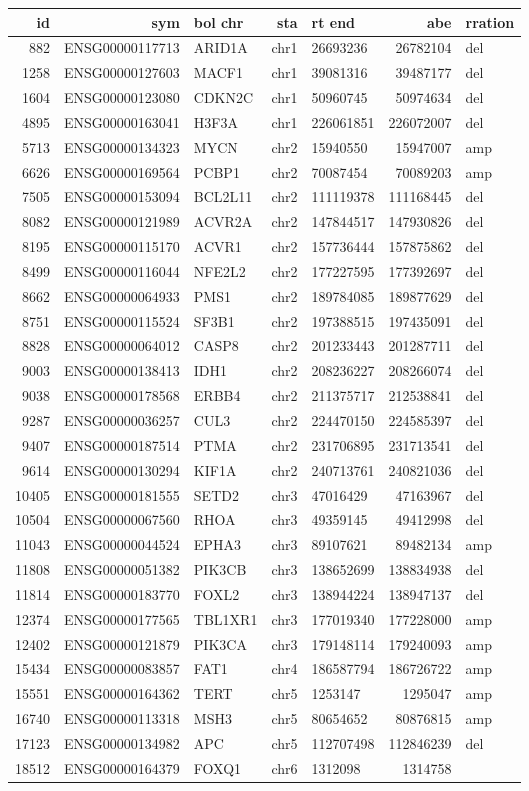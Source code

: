 \documentclass[]{article}
\begin{document}
\begin{longtable}[]{@{}rrlrlrl@{}}
\toprule
id & sym & bol chr & sta & rt end & abe & rration\tabularnewline
\midrule
\endhead
882 & ENSG00000117713 & ARID1A & chr1 & 26693236 & 26782104 &
del\tabularnewline
1258 & ENSG00000127603 & MACF1 & chr1 & 39081316 & 39487177 &
del\tabularnewline
1604 & ENSG00000123080 & CDKN2C & chr1 & 50960745 & 50974634 &
del\tabularnewline
4895 & ENSG00000163041 & H3F3A & chr1 & 226061851 & 226072007 &
del\tabularnewline
5713 & ENSG00000134323 & MYCN & chr2 & 15940550 & 15947007 &
amp\tabularnewline
6626 & ENSG00000169564 & PCBP1 & chr2 & 70087454 & 70089203 &
amp\tabularnewline
7505 & ENSG00000153094 & BCL2L11 & chr2 & 111119378 & 111168445 &
del\tabularnewline
8082 & ENSG00000121989 & ACVR2A & chr2 & 147844517 & 147930826 &
del\tabularnewline
8195 & ENSG00000115170 & ACVR1 & chr2 & 157736444 & 157875862 &
del\tabularnewline
8499 & ENSG00000116044 & NFE2L2 & chr2 & 177227595 & 177392697 &
del\tabularnewline
8662 & ENSG00000064933 & PMS1 & chr2 & 189784085 & 189877629 &
del\tabularnewline
8751 & ENSG00000115524 & SF3B1 & chr2 & 197388515 & 197435091 &
del\tabularnewline
8828 & ENSG00000064012 & CASP8 & chr2 & 201233443 & 201287711 &
del\tabularnewline
9003 & ENSG00000138413 & IDH1 & chr2 & 208236227 & 208266074 &
del\tabularnewline
9038 & ENSG00000178568 & ERBB4 & chr2 & 211375717 & 212538841 &
del\tabularnewline
9287 & ENSG00000036257 & CUL3 & chr2 & 224470150 & 224585397 &
del\tabularnewline
9407 & ENSG00000187514 & PTMA & chr2 & 231706895 & 231713541 &
del\tabularnewline
9614 & ENSG00000130294 & KIF1A & chr2 & 240713761 & 240821036 &
del\tabularnewline
10405 & ENSG00000181555 & SETD2 & chr3 & 47016429 & 47163967 &
del\tabularnewline
10504 & ENSG00000067560 & RHOA & chr3 & 49359145 & 49412998 &
del\tabularnewline
11043 & ENSG00000044524 & EPHA3 & chr3 & 89107621 & 89482134 &
amp\tabularnewline
11808 & ENSG00000051382 & PIK3CB & chr3 & 138652699 & 138834938 &
del\tabularnewline
11814 & ENSG00000183770 & FOXL2 & chr3 & 138944224 & 138947137 &
del\tabularnewline
12374 & ENSG00000177565 & TBL1XR1 & chr3 & 177019340 & 177228000 &
amp\tabularnewline
12402 & ENSG00000121879 & PIK3CA & chr3 & 179148114 & 179240093 &
amp\tabularnewline
15434 & ENSG00000083857 & FAT1 & chr4 & 186587794 & 186726722 &
amp\tabularnewline
15551 & ENSG00000164362 & TERT & chr5 & 1253147 & 1295047 &
amp\tabularnewline
16740 & ENSG00000113318 & MSH3 & chr5 & 80654652 & 80876815 &
amp\tabularnewline
17123 & ENSG00000134982 & APC & chr5 & 112707498 & 112846239 &
del\tabularnewline
18512 & ENSG00000164379 & FOXQ1 & chr6 & 1312098 & 1314758 &

\end{longtable}
\end{document}

